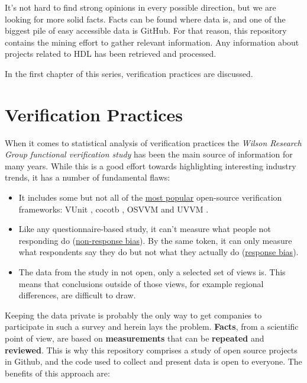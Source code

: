 \documentclass[]{report}
\providecommand{\tightlist}{%
  \setlength{\itemsep}{0pt}\setlength{\parskip}{0pt}}
\begin{document}
It's not hard to find strong opinions in every possible direction, but we are looking for more solid facts. Facts can be found where data is, and one of the biggest pile of easy accessible data is GitHub. For that reason, this repository contains the mining effort to gather relevant information. Any information about projects related to HDL has been retrieved and processed.

In the first chapter of this series, verification practices are discussed.

\hypertarget{verification-practices}{%
\chapter{Verification Practices}\label{verification-practices}}

When it comes to statistical analysis of verification practices the \emph{Wilson Research Group functional verification study} \autocite{wilson14} \autocite{wilson16} \autocite{wilson18} has been the main source of information for many years. While this is a good effort towards highlighting interesting industry trends, it has a number of fundamental flaws:

\begin{itemize}
\tightlist
\item
  It includes some but not all of the \href{https://star-history.t9t.io/\#vunit/vunit\&osvvm/osvvm\&cocotb/cocotb\&UVVM/UVVM}{most popular} open-source verification frameworks: VUnit \autocite{vunit}, cocotb \autocite{cocotb}, OSVVM \autocite{osvvm} and UVVM \autocite{uvvm}.
\item
  Like any questionnaire-based study, it can't measure what people not responding do (\href{https://en.wikipedia.org/wiki/Participation_bias}{non-response bias}). By the same token, it can only measure what respondents say they do but not what they actually do (\href{https://en.wikipedia.org/wiki/Response_bias}{response bias}).
\item
  The data from the study in not open, only a selected set of views is. This means that conclusions outside of those views, for example regional differences, are difficult to draw.
\end{itemize}

Keeping the data private is probably the only way to get companies to participate in such a survey and herein lays the problem. \textbf{Facts}, from a scientific point of view, are based on \textbf{measurements} that can be \textbf{repeated} and \textbf{reviewed}. This is why this repository comprises a study of open source projects in Github, and the code used to collect and present data is open to everyone. The benefits of this approach are:
\end{document}
